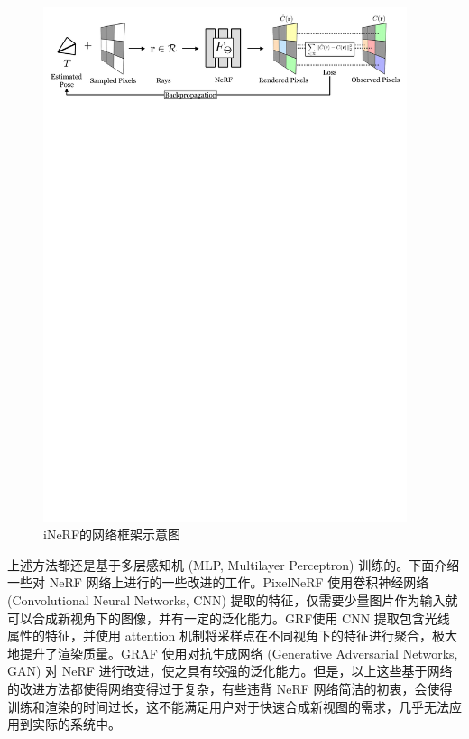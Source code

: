 \begin{figure}[tbhp]
    \centering
    \includegraphics[width=0.95\textwidth]{figures/iNeRF.pdf}
    \caption{iNeRF\cite{yen2020inerf}的网络框架示意图}
    \label{fig:inerf}
\end{figure}

上述方法都还是基于多层感知机 (MLP, Multilayer Perceptron) 训练的。下面介绍一些对 NeRF 网络上进行的一些改进的工作。PixelNeRF\cite{yu2020pixelnerf} 使用卷积神经网络 (Convolutional Neural Networks, CNN) 提取的特征，仅需要少量图片作为输入就可以合成新视角下的图像，并有一定的泛化能力。GRF\cite{trevithick2020grf}使用 CNN 提取包含光线属性的特征，并使用 attention 机制将采样点在不同视角下的特征进行聚合，极大地提升了渲染质量。GRAF\cite{schwarz2020graf} 使用对抗生成网络 (Generative Adversarial Networks, GAN) 对 NeRF 进行改进，使之具有较强的泛化能力。但是，以上这些基于网络的改进方法都使得网络变得过于复杂，有些违背 NeRF 网络简洁的初衷，会使得训练和渲染的时间过长，这不能满足用户对于快速合成新视图的需求，几乎无法应用到实际的系统中。

